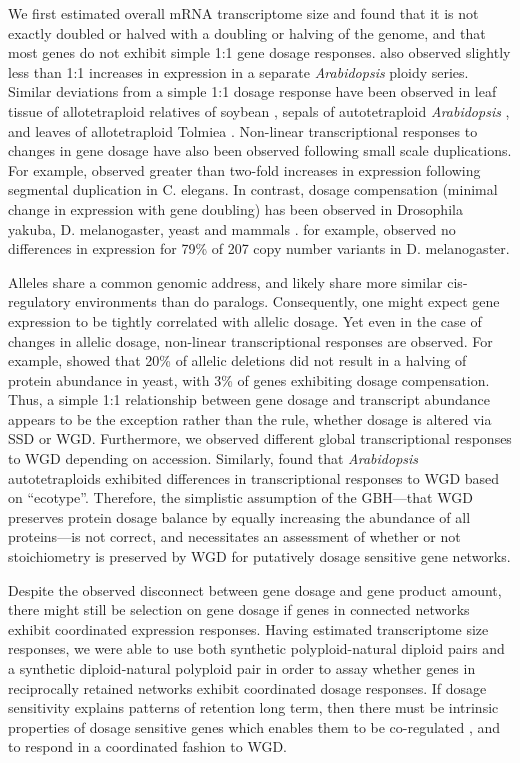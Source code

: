 \documentclass[11pt]{article}
\begin{document}
We first estimated overall mRNA transcriptome size and found that it is not exactly doubled or halved with a doubling or halving of the genome, and that most genes do not exhibit simple 1:1 gene dosage responses. \cite{hou2018} also observed slightly less than 1:1 increases in expression in a separate {\it Arabidopsis} ploidy series. Similar deviations from a simple 1:1 dosage response have been observed in leaf tissue of allotetraploid relatives of soybean \citep{coate2010}, sepals of autotetraploid {\it Arabidopsis} \citep{robinson2018}, and leaves of allotetraploid Tolmiea \citep{visger2019}. 
Non-linear transcriptional responses to changes in gene dosage have also been observed following small scale duplications. For example, \cite{konrad2018} observed greater than two-fold increases in expression following segmental duplication in C. elegans. In contrast, dosage compensation (minimal change in expression with gene doubling) has been observed in Drosophila yakuba, D. melanogaster, yeast and mammals \citep{qian2010, rogers2017, zhou2011}. \cite{zhou2011} for example, observed no differences in expression for 79\% of 207 copy number variants in D. melanogaster. 

Alleles share a common genomic address, and likely share more similar cis-regulatory environments than do paralogs. Consequently, one might expect gene expression to be tightly correlated with allelic dosage. Yet even in the case of changes in allelic dosage, non-linear transcriptional responses are observed. For example, \cite{springer2010} showed that 20\% of allelic deletions did not result in a halving of protein abundance in yeast, with 3\% of genes exhibiting dosage compensation. Thus, a simple 1:1 relationship between gene dosage and transcript abundance appears to be the exception rather than the rule, whether dosage is altered via SSD or WGD. Furthermore, we observed different global transcriptional responses to WGD depending on accession. Similarly, \cite{yu2010} found that {\it Arabidopsis} autotetraploids exhibited differences in transcriptional responses to WGD based on ``ecotype''. Therefore, the simplistic assumption of the GBH---that WGD preserves protein dosage balance by equally increasing the abundance of all proteins---is not correct, and necessitates an assessment of whether or not stoichiometry is preserved by WGD for putatively dosage sensitive gene networks.

Despite the observed disconnect between gene dosage and gene product amount, there might still be selection on gene dosage if genes in connected networks exhibit coordinated expression responses. Having estimated transcriptome size responses, we were able to use both synthetic polyploid-natural diploid pairs and a synthetic diploid-natural polyploid pair in order to assay whether genes in reciprocally retained networks exhibit coordinated dosage responses. If dosage sensitivity explains patterns of retention long term, then there must be intrinsic properties of dosage sensitive genes which enables  them to be co-regulated \citep{papp2003}, and to respond in a coordinated fashion to WGD.
\end{document}
